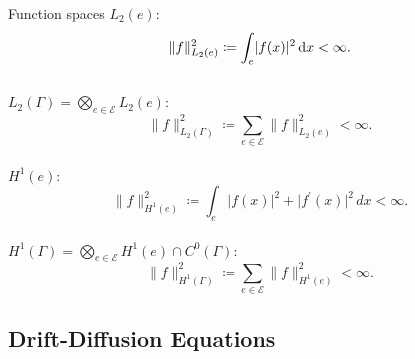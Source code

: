 \documentclass[9pt]{beamer}
\begin{document}
\begin{frame}{Function spaces}
    $L_2(e)$: \\
    \begin{equation*}
        \lVert f \rVert^{2}_{L_2(e)} \coloneqq \int_e \lvert f(x) \rvert^2 \, \textup{d} x < \infty.
    \end{equation*} \\
    $L_2(\Gamma) = \bigotimes_{e \in \mathcal{E}} L_2(e)$: \\
    \begin{equation*}
        \lVert f \rVert^{2}_{L_2(\Gamma)} \coloneqq \sum_{e \in \mathcal{E}} \lVert f \rVert^{2}_{L_2(e)} < \infty.
    \end{equation*} \\
    $H^1 (e)$: \\
    \begin{equation*}
        \lVert f \rVert^{2}_{H^1(e)} \coloneqq \int_e \lvert f(x) \rvert^2 + \lvert f^{\prime}(x) \rvert^2 \, dx < \infty.
    \end{equation*} \\
    $H^1 (\Gamma) =  \bigotimes_{e \in \mathcal{E}} H^1 (e) \cap C^{0}(\Gamma)$: \\
    \begin{equation*}
        \lVert f \rVert^{2}_{H^1 (\Gamma)} \coloneqq \sum_{e \in \mathcal{E}} \lVert f \rVert^{2}_{H^1 (e)} < \infty.
    \end{equation*}
\end{frame}



\subsection{Drift-Diffusion Equations}
\end{document}
